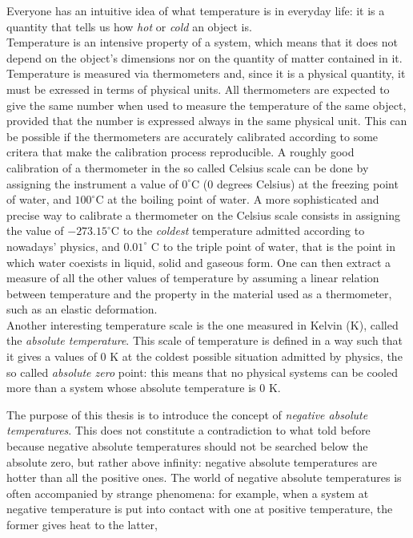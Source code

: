 Everyone has an intuitive idea of what temperature is in everyday life: it is a quantity that tells us how \emph{hot} or \emph{cold} an object is. \\
Temperature is an intensive property of a system, which means that it does not depend on the object's dimensions nor on the quantity of matter contained in it. \\
Temperature is measured via thermometers and, since it is a physical quantity, it must be exressed in terms of physical units. All thermometers are expected to give the same number when used to measure the temperature of the same object, provided that 
the number is expressed always in the same physical unit. This can be possible if the thermometers are accurately calibrated according to some critera that make the calibration process reproducible. 
A roughly good calibration of a thermometer in the so called Celsius scale can be done by assigning the instrument a value of $0^\circ$C (0 degrees Celsius) at the freezing point of water, and $100^\circ$C at the boiling point of water. A more sophisticated and precise way to calibrate a thermometer 
on the Celsius scale consists in assigning the value of $-273.15^\circ$C to the \emph{coldest} temperature admitted according to nowadays' physics, and $0.01^\circ$ C to the triple point of water, that 
is the point in which water coexists in liquid, solid and gaseous form. One can then extract a measure of all the other values of temperature by assuming a linear relation between temperature and the property in the material used as a thermometer,
such as an elastic deformation. \\
Another interesting temperature scale is the one measured in Kelvin (K), called the \emph{absolute temperature}. This scale of temperature is 
defined in a way such that it gives a values of $0$ K at the coldest possible situation admitted by physics, the so called \emph{absolute zero} point: this means that no physical systems can be cooled more than a system 
whose absolute temperature is $0$ K. \par
\vspace{10pt}
The purpose of this thesis is to introduce the concept of \emph{negative absolute temperatures}. This does not constitute a contradiction to what told before because negative absolute temperatures should not be searched below the absolute zero, but rather 
above infinity: negative absolute temperatures are hotter than all the positive ones. The world of negative absolute temperatures is often accompanied by strange phenomena: for example, when a system at negative temperature is put into contact with one at positive temperature, the former gives heat to the latter,
